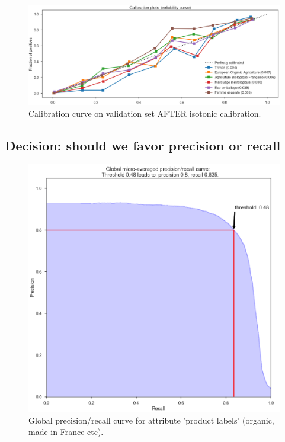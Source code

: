 \begin{figure}[H]
\centering
\includegraphics[scale=0.40]{./images/calibration/calibration_val_after.png}
\caption{Calibration curve on validation set AFTER isotonic calibration.}
\end{figure}


\subsection{Decision: should we favor precision or recall}

\begin{figure}[H]
\centering
\includegraphics[scale=0.4]{./images/calibration/islabeledby_global_curve.png}
\caption{Global precision/recall curve for attribute 'product labels' (organic, made in France etc).}
\end{figure}


